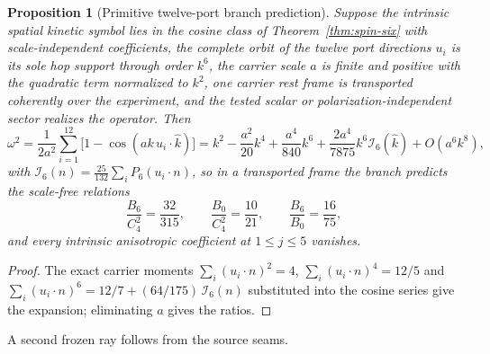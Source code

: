 \documentclass[11pt]{article}
\newtheorem{proposition}[theorem]{Proposition}
\theoremstyle{definition}
\theoremstyle{remark}
\begin{document}
\begin{proposition}[Primitive twelve-port branch prediction]
\label{prop:spin-six-prediction}
Suppose the intrinsic spatial kinetic symbol lies in the cosine class of
Theorem~\ref{thm:spin-six} with scale-independent coefficients, the complete
orbit of the twelve port directions $u_i$ is its sole hop support through
order $k^6$, the carrier scale $a$ is finite and positive with the quadratic
term normalized to $k^2$, one carrier rest frame is transported coherently
over the experiment, and the tested scalar or polarization-independent sector
realizes the operator. Then
\begin{equation}
\omega^2
=\frac{1}{2a^2}\sum_{i=1}^{12}
 \bigl[1-\cos(ak\,u_i\!\cdot\!\widehat k)\bigr]
=k^2-\frac{a^2}{20}k^4+\frac{a^4}{840}k^6
 +\frac{2a^4}{7875}k^6\mathcal I_6(\widehat k)
 +O(a^6k^8),
\label{eq:primitive-port-expansion}
\end{equation}
with $\mathcal I_6(n)=\tfrac{25}{132}\sum_iP_6(u_i\!\cdot\!n)$, so in a
transported frame the branch predicts the scale-free relations
\begin{equation}
\frac{B_6}{C_4^2}=\frac{32}{315},\qquad
\frac{B_0}{C_4^2}=\frac{10}{21},\qquad
\frac{B_6}{B_0}=\frac{16}{75},
\label{eq:primitive-port-ratios}
\end{equation}
and every intrinsic anisotropic coefficient at $1\le j\le5$ vanishes.
\end{proposition}

\begin{proof}
The exact carrier moments $\sum_i(u_i\!\cdot\!n)^2=4$,
$\sum_i(u_i\!\cdot\!n)^4=12/5$ and
$\sum_i(u_i\!\cdot\!n)^6=12/7+(64/175)\,\mathcal I_6(n)$ substituted into the
cosine series give the expansion; eliminating $a$ gives the ratios.
\end{proof}

A second frozen ray follows from the source seams.
\end{document}
